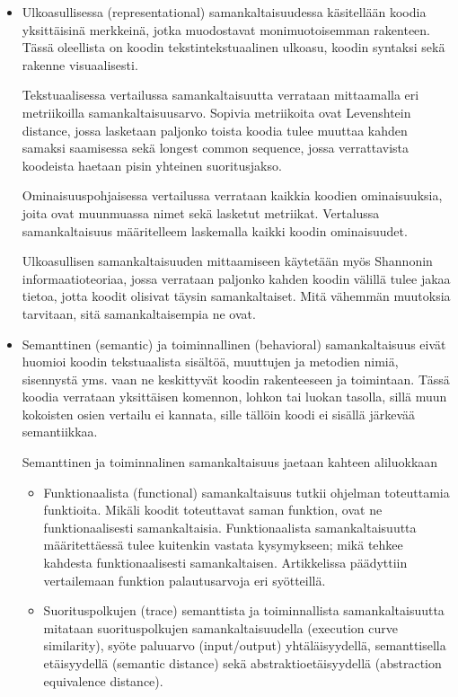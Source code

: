 \documentclass[finnish]{tktltiki2}
\theoremstyle{definition}
\theoremstyle{remark}
\begin{document}
\begin{itemize}
\item{Ulkoasullisessa (representational)}
samankaltaisuudessa käsitellään koodia yksittäisinä merkkeinä, jotka muodostavat monimuotoisemman rakenteen. Tässä oleellista on koodin tekstintekstuaalinen ulkoasu, koodin syntaksi sekä rakenne visuaalisesti.

Tekstuaalisessa vertailussa samankaltaisuutta verrataan mittaamalla eri metriikoilla samankaltaisuusarvo. Sopivia metriikoita ovat Levenshtein distance, jossa lasketaan paljonko toista koodia tulee muuttaa kahden samaksi saamisessa sekä longest common sequence, jossa verrattavista koodeista haetaan pisin yhteinen suoritusjakso.

Ominaisuuspohjaisessa vertailussa verrataan kaikkia koodien ominaisuuksia, joita ovat muunmuassa nimet sekä lasketut metriikat. Vertalussa samankaltaisuus määritelleem laskemalla kaikki koodin ominaisuudet.

Ulkoasullisen samankaltaisuuden mittaamiseen käytetään myös Shannonin informaatioteoriaa, jossa verrataan paljonko kahden koodin välillä tulee jakaa tietoa, jotta koodit olisivat täysin samankaltaiset. Mitä vähemmän muutoksia tarvitaan, sitä samankaltaisempia ne ovat.

\item{Semanttinen (semantic) ja toiminnallinen (behavioral) }
samankaltaisuus eivät huomioi koodin tekstuaalista sisältöä, muuttujen ja metodien nimiä, sisennystä yms. vaan ne keskittyvät koodin rakenteeseen ja toimintaan.
Tässä koodia verrataan yksittäisen komennon, lohkon tai luokan tasolla, sillä muun kokoisten osien vertailu ei kannata, sille tällöin koodi ei sisällä järkevää semantiikkaa.

Semanttinen ja toiminnalinen samankaltaisuus jaetaan kahteen aliluokkaan
\begin{itemize}
\item{Funktionaalista (functional) samankaltaisuus} tutkii ohjelman toteuttamia funktioita. Mikäli koodit toteuttavat saman funktion, ovat ne funktionaalisesti samankaltaisia. 
Funktionaalista samankaltaisuutta määritettäessä tulee kuitenkin vastata kysymykseen; mikä tehkee kahdesta funktionaalisesti samankaltaisen. Artikkelissa päädyttiin vertailemaan funktion palautusarvoja eri syötteillä.

\item{Suorituspolkujen (trace) } semanttista ja toiminnallista samankaltaisuutta mitataan suorituspolkujen samankaltaisuudella (execution curve similarity), syöte paluuarvo (input/output) yhtäläisyydellä, semanttisella etäisyydellä (semantic distance) sekä abstraktioetäisyydellä (abstraction equivalence distance).


\end{itemize}
\end{itemize}
\end{document}
